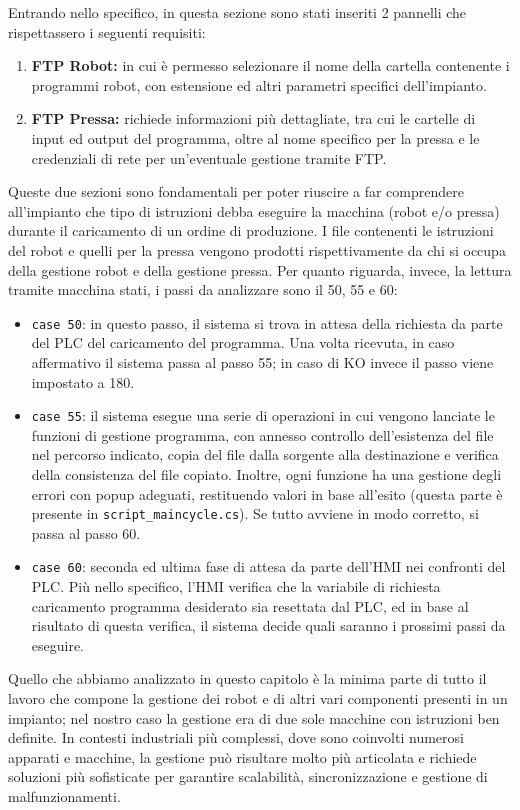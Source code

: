 Entrando nello specifico, in questa sezione sono stati inseriti 2 pannelli che rispettassero i seguenti requisiti:
\begin{enumerate}
    \item \textbf{FTP Robot:} in cui è permesso selezionare il nome della cartella contenente i programmi robot, con estensione ed altri parametri specifici dell'impianto.
    \item \textbf{FTP Pressa:} richiede informazioni più dettagliate, tra cui le cartelle di input ed output del programma, oltre al nome specifico per la pressa e le credenziali di rete per un'eventuale gestione tramite FTP.
\end{enumerate}
Queste due sezioni sono fondamentali per poter riuscire a far comprendere all'impianto che tipo di istruzioni debba eseguire la macchina (robot e/o pressa) durante il caricamento di un ordine di produzione. I file contenenti le istruzioni del robot e quelli per la pressa vengono prodotti rispettivamente da chi si occupa della gestione robot e della gestione pressa. Per quanto riguarda, invece, la lettura tramite macchina stati, i passi da analizzare sono il 50, 55 e 60:
\begin{itemize}
    \item \verb|case 50|: in questo passo, il sistema si trova in attesa della richiesta da parte del PLC del caricamento del programma. Una volta ricevuta, in caso affermativo il sistema passa al passo 55; in caso di KO invece il passo viene impostato a 180.
    \item \verb|case 55|: il sistema esegue una serie di operazioni in cui vengono lanciate le funzioni di gestione programma, con annesso controllo dell'esistenza del file nel percorso indicato, copia del file dalla sorgente alla destinazione e verifica della consistenza del file copiato. Inoltre, ogni funzione ha una gestione degli errori con popup adeguati, restituendo valori in base all'esito (questa parte è presente in \verb|script_maincycle.cs|). Se tutto avviene in modo corretto, si passa al passo 60.
    \item \verb|case 60|: seconda ed ultima fase di attesa da parte dell'HMI nei confronti del PLC. Più nello specifico, l'HMI verifica che la variabile di richiesta caricamento programma desiderato sia resettata dal PLC, ed in base al risultato di questa verifica, il sistema decide quali saranno i prossimi passi da eseguire.
\end{itemize}
Quello che abbiamo analizzato in questo capitolo è la minima parte di tutto il lavoro che compone la gestione dei robot e di altri vari componenti presenti in un impianto; nel nostro caso la gestione era di due sole macchine con istruzioni ben definite. In contesti industriali più complessi, dove sono coinvolti numerosi apparati e macchine, la gestione può risultare molto più articolata e richiede soluzioni più sofisticate per garantire scalabilità, sincronizzazione e gestione di malfunzionamenti.

